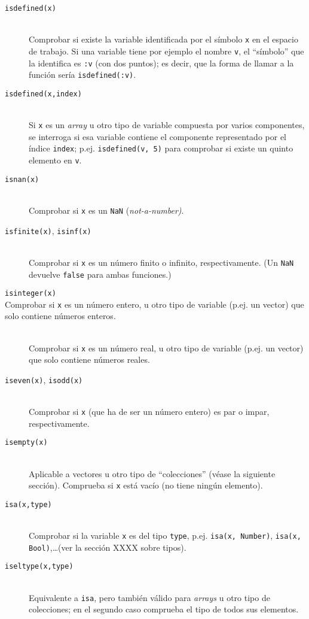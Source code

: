﻿\documentclass{article}
\newcommand{\jl}{\texttt}
\begin{document}
\begin{description}
  \item[\jl{isdefined(x)}] \hfill \\
  Comprobar si existe la variable identificada por el símbolo \jl{x} en el espacio de trabajo. Si una variable tiene por ejemplo el nombre \jl{v}, el ``símbolo'' que la identifica es \jl{:v} (con dos puntos); es decir, que la forma de llamar a la función sería \jl{isdefined(:v)}.
  \item[\jl{isdefined(x,index)}] \hfill \\
  Si \jl{x} es un \emph{array} u otro tipo de variable compuesta por varios componentes, se interroga si esa variable contiene el componente representado por el índice \jl{index}; p.ej. \jl{isdefined(v, 5)} para comprobar si existe un quinto elemento en \jl{v}.
  \item[\jl{isnan(x)}] \hfill \\
  Comprobar si \jl{x} es un \jl{NaN} (\emph{not-a-number)}.
  \item[\jl{isfinite(x)}, \jl{isinf(x)}] \hfill \\
  Comprobar si \jl{x} es un número finito o infinito, respectivamente. (Un \jl{NaN} devuelve \jl{false} para ambas funciones.)
  \item[\jl{isinteger(x)} \hfill \\
  Comprobar si \jl{x} es un número entero, u otro tipo de variable (p.ej. un vector) que solo contiene números enteros.
  \item[\jl{isreal(x)}] \hfill \\
  Comprobar si \jl{x} es un número real, u otro tipo de variable (p.ej. un vector) que solo contiene números reales.
  \item[\jl{iseven(x)}, \jl{isodd(x)}] \hfill \\
  Comprobar si \jl{x} (que ha de ser un número entero) es par o impar, respectivamente.
  \item[\jl{isempty(x)}] \hfill \\
  Aplicable a vectores u otro tipo de ``colecciones'' (véase la siguiente sección). Comprueba si \jl{x} está vacío (no tiene ningún elemento).
  \item[\jl{isa(x,type)}] \hfill \\
  Comprobar si la variable \jl{x} es del tipo \jl{type}, p.ej. \jl{isa(x, Number)}, \jl{isa(x, Bool)},\ldots (ver la sección XXXX sobre tipos).
  \item[\jl{iseltype(x,type)}] \hfill \\
  Equivalente a \jl{isa}, pero también válido para \emph{arrays} u otro tipo de colecciones; en el segundo caso comprueba el tipo de todos sus elementos.

\end{description}
\end{document}
